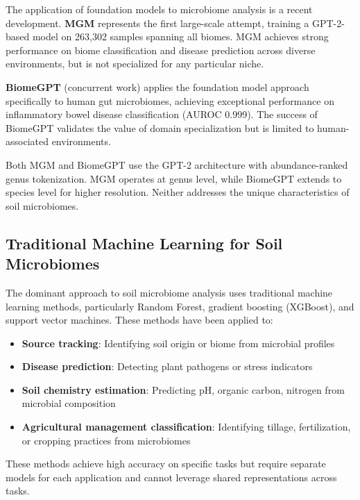 \documentclass[11pt,a4paper]{article}
\begin{document}
The application of foundation models to microbiome analysis is a recent development. \textbf{MGM} \citep{mgm2024} represents the first large-scale attempt, training a GPT-2-based model on 263,302 samples spanning all biomes. MGM achieves strong performance on biome classification and disease prediction across diverse environments, but is not specialized for any particular niche.

\textbf{BiomeGPT} (concurrent work) applies the foundation model approach specifically to human gut microbiomes, achieving exceptional performance on inflammatory bowel disease classification (AUROC 0.999). The success of BiomeGPT validates the value of domain specialization but is limited to human-associated environments.

Both MGM and BiomeGPT use the GPT-2 architecture with abundance-ranked genus tokenization. MGM operates at genus level, while BiomeGPT extends to species level for higher resolution. Neither addresses the unique characteristics of soil microbiomes.

\subsection{Traditional Machine Learning for Soil Microbiomes}

The dominant approach to soil microbiome analysis uses traditional machine learning methods, particularly Random Forest, gradient boosting (XGBoost), and support vector machines. These methods have been applied to:

\begin{itemize}[leftmargin=1.5em]
    \item \textbf{Source tracking}: Identifying soil origin or biome from microbial profiles \citep{thompson2017communal}
    \item \textbf{Disease prediction}: Detecting plant pathogens or stress indicators \citep{naylor2017drought}
    \item \textbf{Soil chemistry estimation}: Predicting pH, organic carbon, nitrogen from microbial composition
    \item \textbf{Agricultural management classification}: Identifying tillage, fertilization, or cropping practices from microbiomes
\end{itemize}

These methods achieve high accuracy on specific tasks but require separate models for each application and cannot leverage shared representations across tasks.
\end{document}
